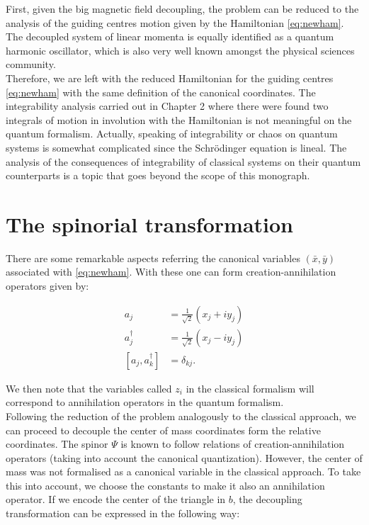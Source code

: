 First, given the big magnetic field decoupling, the problem can be reduced to the analysis of the guiding centres motion given by the Hamiltonian \eqref{eq:newham}. The decoupled system of linear momenta is equally identified as a quantum harmonic oscillator, which is also very well known amongst the physical sciences community.\\


Therefore, we are left with the reduced Hamiltonian for the guiding centres \eqref{eq:newham} with the same definition of the canonical coordinates. The integrability analysis carried out in Chapter 2 where there were found two integrals of motion in involution with the Hamiltonian is not meaningful on the quantum formalism. Actually, speaking of integrability or chaos on quantum systems is somewhat complicated since the Schr\"odinger equation is lineal. The analysis of the consequences of integrability of classical systems on their quantum counterparts is a topic that goes beyond the scope of this monograph.\\


\section{The spinorial transformation}
There are some remarkable aspects referring the canonical variables $(\bar{x},\bar{y})$ associated with \eqref{eq:newham}. With these one can form creation-annihilation operators given by:

\begin{align*}
a_j &= \frac{1}{\sqrt{2}}(x_j+iy_j)\\
a_j^\dagger &= \frac{1}{\sqrt{2}}(x_j-iy_j)\\
\left[a_j,a_k^\dagger\right] &= \delta_{kj}.
\end{align*}

We then note that the variables called $z_i$ in the classical formalism will correspond to annihilation operators in the quantum formalism.\\

Following the reduction of the problem analogously to the classical approach, we can proceed to decouple the center of mass coordinates form the relative coordinates. The spinor $\Psi$ is known to follow relations of creation-annihilation operators (taking into account the canonical quantization). However, the center of mass was not formalised as a canonical variable in the classical approach. To take this into account, we choose the constants to make it also an annihilation operator. If we encode the center of the triangle in $b$, the decoupling transformation can be expressed in the following way:

